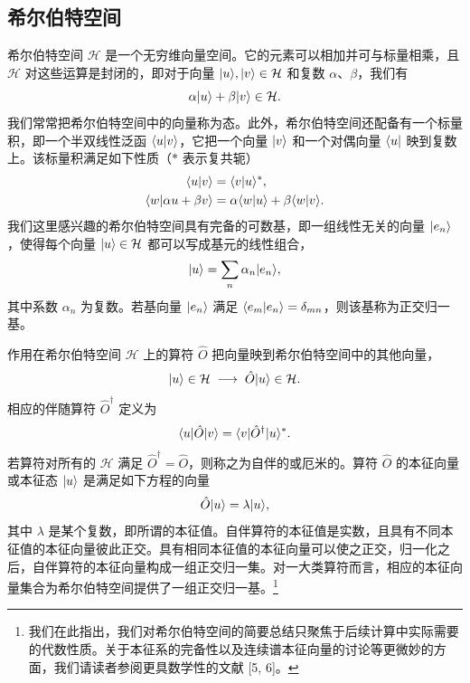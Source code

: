 \subsection{希尔伯特空间}

希尔伯特空间 $\mathcal{H}$ 是一个无穷维向量空间。它的元素可以相加并可与标量相乘，且 $\mathcal{H}$ 对这些运算是封闭的，即对于向量 $|u\rangle, |v\rangle \in \mathcal{H}$ 和复数 $\alpha$、$\beta$，我们有
\begin{equation}
  \alpha|u\rangle + \beta|v\rangle \in \mathcal{H}.
\end{equation}
我们常常把希尔伯特空间中的向量称为态。此外，希尔伯特空间还配备有一个标量积，即一个半双线性泛函 $\langle u|v\rangle$，它把一个向量 $|v\rangle$ 和一个对偶向量 $\langle u|$ 映到复数上。该标量积满足如下性质（$*$ 表示复共轭）
\begin{align}
  \langle u|v\rangle &= \langle v|u\rangle^*, \\
  \langle w|\alpha u + \beta v\rangle &= \alpha\langle w|u\rangle + \beta\langle w|v\rangle.
\end{align}
我们这里感兴趣的希尔伯特空间具有完备的可数基，即一组线性无关的向量 $|e_n\rangle$，使得每个向量 $|u\rangle \in \mathcal{H}$ 都可以写成基元的线性组合，
\begin{equation}
  |u\rangle = \sum_n \alpha_n |e_n\rangle,
\end{equation}
其中系数 $\alpha_n$ 为复数。若基向量 $|e_n\rangle$ 满足 $\langle e_m|e_n\rangle = \delta_{mn}$，则该基称为正交归一基。

作用在希尔伯特空间 $\mathcal{H}$ 上的算符 $\hat{O}$ 把向量映到希尔伯特空间中的其他向量，
\begin{equation}
  |u\rangle\in\mathcal{H} \;\longrightarrow\; \hat{O}|u\rangle\in\mathcal{H}.
\end{equation}
相应的伴随算符 $\hat{O}^\dagger$ 定义为
\begin{equation}
  \langle u|\hat{O}|v\rangle = \langle v|\hat{O}^\dagger|u\rangle^*.
\end{equation}
若算符对所有的 $\mathcal{H}$ 满足 $\hat{O}^\dagger = \hat{O}$，则称之为自伴的或厄米的。算符 $\hat{O}$ 的本征向量或本征态 $|u\rangle$ 是满足如下方程的向量
\begin{equation}
  \hat{O}|u\rangle = \lambda|u\rangle,
\end{equation}
其中 $\lambda$ 是某个复数，即所谓的本征值。自伴算符的本征值是实数，且具有不同本征值的本征向量彼此正交。具有相同本征值的本征向量可以使之正交，归一化之后，自伴算符的本征向量构成一组正交归一集。对一大类算符而言，相应的本征向量集合为希尔伯特空间提供了一组正交归一基。\footnote{我们在此指出，我们对希尔伯特空间的简要总结只聚焦于后续计算中实际需要的代数性质。关于本征系的完备性以及连续谱本征向量的讨论等更微妙的方面，我们请读者参阅更具数学性的文献 [5, 6]。}

